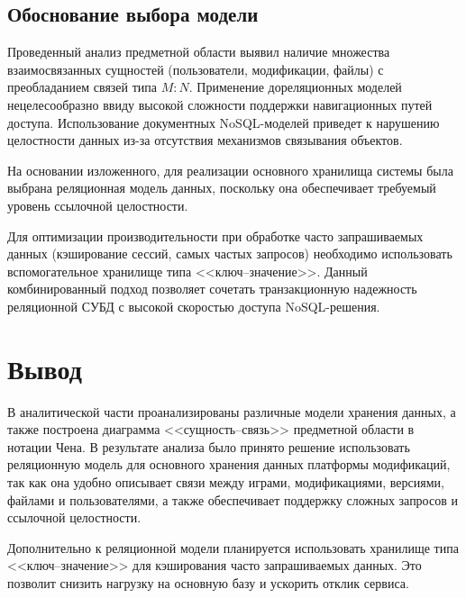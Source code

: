 \subsection{Обоснование выбора модели}

Проведенный анализ предметной области выявил наличие множества взаимосвязанных сущностей (пользователи, модификации, файлы) с преобладанием связей типа $M:N$. Применение дореляционных моделей нецелесообразно ввиду высокой сложности поддержки навигационных путей доступа. Использование документных NoSQL-моделей приведет к нарушению целостности данных из-за отсутствия механизмов связывания объектов.

На основании изложенного, для реализации основного хранилища системы была выбрана реляционная модель данных, поскольку она обеспечивает требуемый уровень ссылочной целостности.

Для оптимизации производительности при обработке часто запрашиваемых данных (кэширование сессий, самых частых запросов) необходимо использовать вспомогательное хранилище типа <<ключ--значение>>. Данный комбинированный подход позволяет сочетать транзакционную надежность реляционной СУБД с высокой скоростью доступа NoSQL-решения.

\section{Вывод}

В аналитической части проанализированы различные модели хранения данных, а также построена диаграмма <<сущность--связь>> предметной области в нотации Чена. В результате анализа было принято решение использовать реляционную модель для основного хранения данных платформы модификаций, так как она удобно описывает связи между играми, модификациями, версиями, файлами и пользователями, а также обеспечивает поддержку сложных запросов и ссылочной целостности.  

Дополнительно к реляционной модели планируется использовать хранилище типа <<ключ--значение>> для кэширования часто запрашиваемых данных. Это позволит снизить нагрузку на основную базу и ускорить отклик сервиса.

\clearpage
